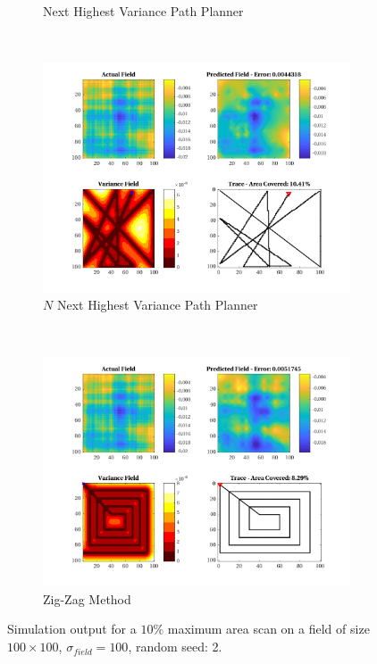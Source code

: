\begin{figure}[htb!]
\begin{subfigure}[t]{0.5\textwidth}
        \captionsetup{skip=0.10\baselineskip,size=footnotesize}
        \caption{Next Highest Variance Path Planner}
    \end{subfigure}%
    \\
    \begin{subfigure}[t]{0.5\textwidth}
        \centering
        \includegraphics[width=\linewidth]{figures/hbresults/nnhv_10p_100x100_sf_100_seed_2.png}
        \captionsetup{skip=0.10\baselineskip,size=footnotesize}
        \caption{$N$ Next Highest Variance Path Planner}
    \end{subfigure}%
    ~
    \begin{subfigure}[t]{0.5\textwidth}
        \centering
        \includegraphics[width=\linewidth]{figures/hbresults/zz_10p_100x100_sf_100_seed_2.png}
        \captionsetup{skip=0.10\baselineskip,size=footnotesize}
        \caption{Zig-Zag Method}
    \end{subfigure}%
    \captionsetup{skip=0.20\baselineskip}
    \caption{Simulation output for a $10\%$ maximum area scan on a field of size $100 \times 100$, $\sigma_{field} = 100$, random seed: 2.}
    \label{fig:sim_sigma100_p10_s2}
\end{figure}


